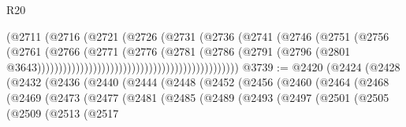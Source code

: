 \begin{lexlean}{R20}
\begin{coremodule}
                                                            (@2711
                                                              (@2716
                                                                (@2721
                                                                  (@2726
                                                                    (@2731
                                                                      (@2736
                                                                        (@2741
                                                                          (@2746
                                                                            (@2751
                                                                              (@2756
                                                                                (@2761
                                                                                  (@2766
                                                                                    (@2771
                                                                                      (@2776
                                                                                        (@2781
                                                                                          (@2786
                                                                                            (@2791
                                                                                              (@2796
                                                                                                (@2801
                                                                                                  @3643)))))))))))))))))))))))))))))))))))))))))))))))
@3739 := @2420
    (@2424
      (@2428
        (@2432
          (@2436
            (@2440
              (@2444
                (@2448
                  (@2452
                    (@2456
                      (@2460
                        (@2464
                          (@2468
                            (@2469
                              (@2473
                                (@2477
                                  (@2481
                                    (@2485
                                      (@2489
                                        (@2493
                                          (@2497
                                            (@2501
                                              (@2505
                                                (@2509
                                                  (@2513
                                                    (@2517

\end{coremodule}
\end{lexlean}
